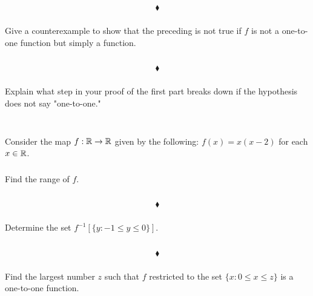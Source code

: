 $$\blacklozenge$$

\subsubsection{}
\begin{tcolorbox}
Give a counterexample to show that the preceding is not true if $f$ is not a one-to-one function but simply a function. 
\end{tcolorbox}
$$ $$

$$\blacklozenge$$

\subsubsection{}
\begin{tcolorbox}
Explain what step in your proof of the first part breaks down if the hypothesis does not say "one-to-one." 
\end{tcolorbox}
$$ $$


\renewcommand{\thesubsection}{\thesection.\RomanNumeralCaps{6}}
\subsection{}
Consider the map $f:\mathbb{R}\rightarrow \mathbb{R}$ given by the following: $f(x)=x(x - 2)$ for each $x \in \mathbb{R}$. 
\subsubsection{}
\begin{tcolorbox}
Find the range of $f$.
\end{tcolorbox}
$$ $$

$$\blacklozenge$$

\subsubsection{}
\begin{tcolorbox}
Determine the set $f^{-1}\left[\{y:-1\leq y\leq 0\}\right]$. 
\end{tcolorbox}
$$ $$

$$\blacklozenge$$

\subsubsection{}
\begin{tcolorbox} 
Find the largest number $z$ such that $f$ restricted to the set $\{x :0\leq x \leq z\}$ is a one-to-one function. 
\end{tcolorbox}
$$ $$

